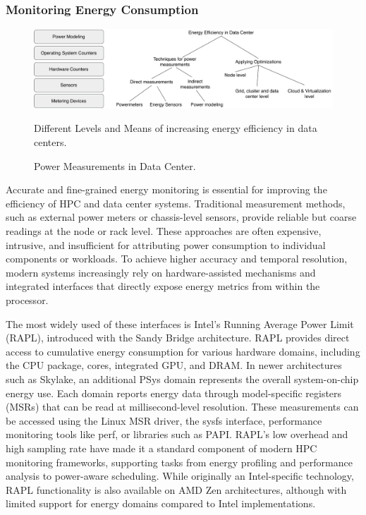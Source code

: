 \subsubsection{Monitoring Energy Consumption}
\label{sec:background_monitoring_energy}

\begin{figure}[H]
    \centering
    \includegraphics[scale=0.4]{fig/02/02-energy-overview.pdf}
    \caption{Power Measurements in Data Center.}
    \label{fig:02-energy-overview}
    \tiny
    Different Levels and Means of increasing energy efficiency in data centers.
\end{figure}
Accurate and fine-grained energy monitoring is essential for improving the efficiency of HPC and data center systems. Traditional measurement methods, such as external power meters or chassis-level sensors, provide reliable but coarse readings at the node or rack level. These approaches are often expensive, intrusive, and insufficient for attributing power consumption to individual components or workloads. To achieve higher accuracy and temporal resolution, modern systems increasingly rely on hardware-assisted mechanisms and integrated interfaces that directly expose energy metrics from within the processor.

The most widely used of these interfaces is Intel's Running Average Power Limit (RAPL), introduced with the Sandy Bridge architecture. RAPL provides direct access to cumulative energy consumption for various hardware domains, including the CPU package, cores, integrated GPU, and DRAM. In newer architectures such as Skylake, an additional PSys domain represents the overall system-on-chip energy use. Each domain reports energy data through model-specific registers (MSRs) that can be read at millisecond-level resolution. These measurements can be accessed using the Linux MSR driver, the sysfs interface, performance monitoring tools like perf, or libraries such as PAPI. RAPL's low overhead and high sampling rate have made it a standard component of modern HPC monitoring frameworks, supporting tasks from energy profiling and performance analysis to power-aware scheduling. While originally an Intel-specific technology, RAPL functionality is also available on AMD Zen architectures, although with limited support for energy domains compared to Intel implementations.

